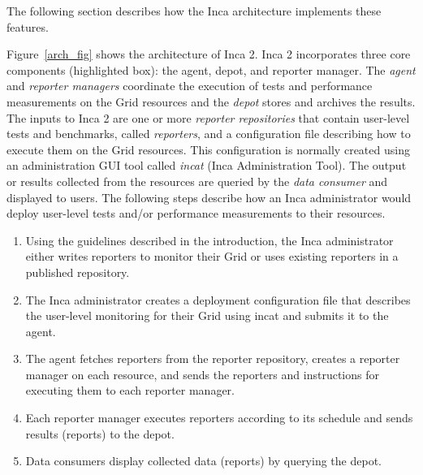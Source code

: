 \documentclass[times,10pt,twocolumn]{article}
\begin{document}
\noindent The following section describes how the Inca architecture implements
these features.


Figure~\ref{arch_fig} shows the architecture of Inca 2.
Inca 2 incorporates three core
components (highlighted box):  the agent, depot, and reporter manager.
The \textit{agent} and \textit{reporter managers} coordinate the execution of
tests and performance measurements on the Grid resources and the
\textit{depot} stores and archives the results.  The inputs to Inca 2 are one
or more \textit{reporter repositories} that contain user-level tests and
benchmarks, called \textit{reporters}, and a configuration file describing how
to execute them on the Grid resources.  This configuration is normally created
using an administration GUI tool
called \textit{incat} (Inca Administration Tool).  The output or results
collected from the resources are queried by the \textit{data consumer} and
displayed to users.  The following steps describe how an Inca administrator
would deploy user-level tests and/or performance measurements to their
resources.

\begin{enumerate}

\item Using the guidelines described in the introduction, the Inca
administrator either writes reporters to monitor their Grid or uses existing
reporters in a published repository.

\item The Inca administrator creates a deployment configuration file that
describes the user-level monitoring for their Grid using incat and submits it
to the agent.

\item The agent fetches reporters from the reporter repository, creates a
reporter manager on each resource, and sends the reporters and instructions for
executing them to each reporter manager.

\item Each reporter manager executes reporters according to its schedule and
sends results (reports) to the depot.

\item Data consumers display collected data (reports) by querying the depot.
\end{enumerate}
\end{document}
